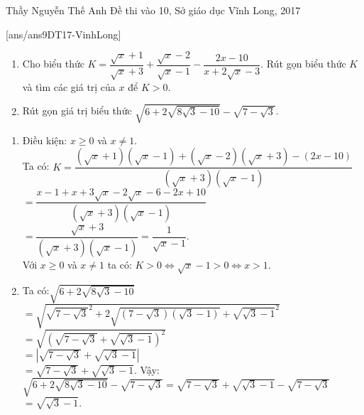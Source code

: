 \begin{name}
{Thầy  Nguyễn Thế Anh}
{Đề thi vào 10, Sở giáo dục Vĩnh Long, 2017}
\end{name}
\setcounter{ex}{0}
[ans/ans9DT17-VinhLong]
\begin{ex}%
    \hfill
    \begin{enumerate}
        \item Cho biểu thức $K =\dfrac{{\sqrt x  + 1}}{{\sqrt x  + 3}} + \dfrac{{\sqrt x  - 2}}{{\sqrt x  - 1}} - \dfrac{{2x - 10}}{{x + 2\sqrt x  - 3}}$. Rút gọn biểu thức $K$ và tìm các giá trị của $x$ để $K>0$.
        \item Rút gọn giá trị biểu thức $\sqrt{6 + 2\sqrt {8\sqrt 3 - 10} }  - \sqrt {7 - \sqrt 3 } $.
    \end{enumerate}
\loigiai
    {
    \begin{enumerate}
        \item
        Điều kiện: $x\geq 0$ và $x\neq 1$.\\
       Ta có: $K=\dfrac{{\left( {\sqrt x  + 1} \right)\left( {\sqrt x  - 1} \right) + \left( {\sqrt x  - 2} \right)\left( {\sqrt x  + 3} \right) - \left( {2x - 10} \right)}}{{\left( {\sqrt x  + 3} \right)\left( {\sqrt x  - 1} \right)}}$\\
        $= \dfrac{{x - 1 + x + 3\sqrt x  - 2\sqrt x  - 6 - 2x + 10}}{{\left( {\sqrt x  + 3} \right)\left( {\sqrt x  - 1} \right)}}$\\
        $= \dfrac{{\sqrt x  + 3}}{{\left( {\sqrt x  + 3} \right)\left( {\sqrt x  - 1} \right)}} = \dfrac{1}{{\sqrt x  - 1}}.$\\
Với $x\geq 0$ và $x\neq 1$ ta có: $K>0 \Leftrightarrow \sqrt x  - 1 > 0 \Leftrightarrow x>1$.
        \item
Ta có:$\sqrt {6 + 2\sqrt {8\sqrt 3  - 10} }$
  $= \sqrt {{{\sqrt {7 - \sqrt 3 } }^2} + 2\sqrt {\left( {7 - \sqrt 3 } \right)\left( {\sqrt 3  - 1} \right)}  + {{\sqrt {\sqrt 3  - 1} }^2}}$ \\
  $= \sqrt {{{\left( {\sqrt {7 - \sqrt 3 }  + \sqrt {\sqrt 3  - 1} } \right)}^2}}$ \\
  $= \left| {\sqrt {7 - \sqrt 3 }  + \sqrt {\sqrt 3  - 1} } \right|$\\
  $= \sqrt {7 - \sqrt 3 }  + \sqrt {\sqrt 3  - 1}.$
Vậy:$\sqrt {6 + 2\sqrt {8\sqrt 3  - 10} }  - \sqrt {7 - \sqrt 3 }  = \sqrt {7 - \sqrt 3 }  + \sqrt {\sqrt 3  - 1}  - \sqrt {7 - \sqrt 3 }$
 $= \sqrt {\sqrt 3  - 1}.$
     \end{enumerate}
    }
\end{ex}

